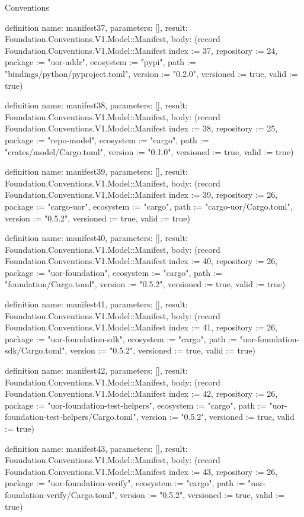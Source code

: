 \begin{lexlean}{Conventions}
\begin{semanticmodule}
definition{
  name: manifest37,
  parameters: [],
  result: Foundation.Conventions.V1.Model::Manifest,
  body: (record Foundation.Conventions.V1.Model::Manifest {index := 37, repository := 24, package := "uor-addr", ecosystem := "pypi", path := "bindings/python/pyproject.toml", version := "0.2.0", versioned := true, valid := true})
}

definition{
  name: manifest38,
  parameters: [],
  result: Foundation.Conventions.V1.Model::Manifest,
  body: (record Foundation.Conventions.V1.Model::Manifest {index := 38, repository := 25, package := "repo-model", ecosystem := "cargo", path := "crates/model/Cargo.toml", version := "0.1.0", versioned := true, valid := true})
}

definition{
  name: manifest39,
  parameters: [],
  result: Foundation.Conventions.V1.Model::Manifest,
  body: (record Foundation.Conventions.V1.Model::Manifest {index := 39, repository := 26, package := "cargo-uor", ecosystem := "cargo", path := "cargo-uor/Cargo.toml", version := "0.5.2", versioned := true, valid := true})
}

definition{
  name: manifest40,
  parameters: [],
  result: Foundation.Conventions.V1.Model::Manifest,
  body: (record Foundation.Conventions.V1.Model::Manifest {index := 40, repository := 26, package := "uor-foundation", ecosystem := "cargo", path := "foundation/Cargo.toml", version := "0.5.2", versioned := true, valid := true})
}

definition{
  name: manifest41,
  parameters: [],
  result: Foundation.Conventions.V1.Model::Manifest,
  body: (record Foundation.Conventions.V1.Model::Manifest {index := 41, repository := 26, package := "uor-foundation-sdk", ecosystem := "cargo", path := "uor-foundation-sdk/Cargo.toml", version := "0.5.2", versioned := true, valid := true})
}

definition{
  name: manifest42,
  parameters: [],
  result: Foundation.Conventions.V1.Model::Manifest,
  body: (record Foundation.Conventions.V1.Model::Manifest {index := 42, repository := 26, package := "uor-foundation-test-helpers", ecosystem := "cargo", path := "uor-foundation-test-helpers/Cargo.toml", version := "0.5.2", versioned := true, valid := true})
}

definition{
  name: manifest43,
  parameters: [],
  result: Foundation.Conventions.V1.Model::Manifest,
  body: (record Foundation.Conventions.V1.Model::Manifest {index := 43, repository := 26, package := "uor-foundation-verify", ecosystem := "cargo", path := "uor-foundation-verify/Cargo.toml", version := "0.5.2", versioned := true, valid := true})
}


\end{semanticmodule}
\end{lexlean}
